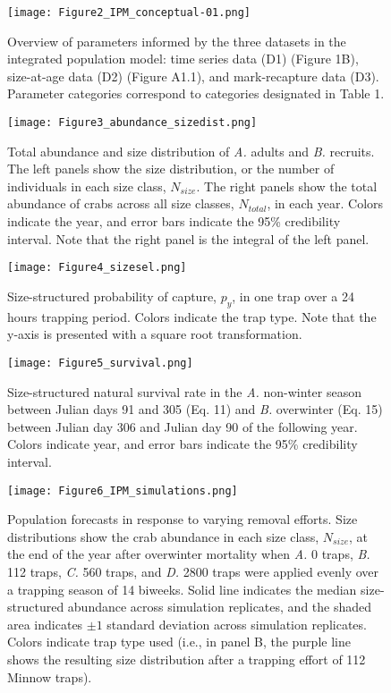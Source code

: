 \documentclass{article}
\begin{document}
\begin{figure}[H]
    \centering
    \texttt{[image: Figure2\_IPM\_conceptual-01.png]}
    \caption{Overview of parameters informed by the three datasets in the integrated population model: time series data (D1) (Figure 1B), size-at-age data (D2) (Figure A1.1), and mark-recapture data (D3). Parameter categories correspond to categories designated in Table 1.}
\end{figure}

\begin{figure}[H]
    \centering
    \texttt{[image: Figure3\_abundance\_sizedist.png]}
    \caption{Total abundance and size distribution of \textit{A.} adults and \textit{B.} recruits. The left panels show the size distribution, or the number of individuals in each size class, $N_{size}$. The right panels show the total abundance of crabs across all size classes, $N_{total}$, in each year. Colors indicate the year, and error bars indicate the 95\% credibility interval. Note that the right panel is the integral of the left panel.}
\end{figure}

\begin{figure}[H]
    \centering
    \texttt{[image: Figure4\_sizesel.png]}
    \caption{Size-structured probability of capture, $p_{y}$, in one trap over a 24 hours trapping period. Colors indicate the trap type. Note that the y-axis is presented with a square root transformation.}
\end{figure}

\begin{figure}[H]
    \centering
    \texttt{[image: Figure5\_survival.png]}
    \caption{Size-structured natural survival rate in the \textit{A.} non-winter season between Julian days 91 and 305 (Eq. 11) and \textit{B.} overwinter (Eq. 15) between Julian day 306 and Julian day 90 of the following year. Colors indicate year, and error bars indicate the 95\% credibility interval.}
\end{figure}

\begin{figure}[H]
    \centering
    \texttt{[image: Figure6\_IPM\_simulations.png]}
    \caption{Population forecasts in response to varying removal efforts. Size distributions show the crab abundance in each size class, $N_{size}$, at the end of the year after overwinter mortality when \textit{A.} 0 traps, \textit{B.} 112 traps, \textit{C.} 560 traps, and \textit{D.} 2800 traps were applied evenly over a trapping season of 14 biweeks. Solid line indicates the median size-structured abundance across simulation replicates, and the shaded area indicates $\pm1$ standard deviation across simulation replicates. Colors indicate trap type used (i.e., in panel B, the purple line shows the resulting size distribution after a trapping effort of 112 Minnow traps).}
\end{figure}

\printbibliography[]
\end{document}
